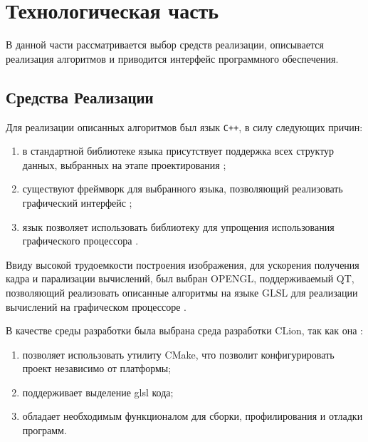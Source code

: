 \chapter{Технологическая часть}
В данной части рассматривается выбор средств реализации, описывается реализация алгоритмов и приводится интерфейс программного
обеспечения.




\section{Средства Реализации}
Для реализации описанных алгоритмов был язык \texttt{C++}, в силу следующих причин:
\begin{enumerate}
	\item в стандартной библиотеке языка присутствует поддержка всех структур данных,
	выбранных на этапе проектирования \cite{STL};
	\item существуют фреймворк для выбранного языка, позволяющий реализовать графический интерфейс \cite{qt_c++};
	\item язык позволяет использовать библиотеку для упрощения использования графического процессора \cite{qt_opengl}.
\end{enumerate}


Ввиду высокой трудоемкости построения изображения, для ускорения получения кадра и
парализации вычислений, был выбран OPENGL, поддерживаемый QT, позволяющий реализовать описанные алгоритмы на языке GLSL для реализации вычислений на графическом процессоре \cite{ray_trace_glsl}.

В качестве среды разработки была выбрана среда разработки  CLion, так как она \cite{clion}:
\begin{enumerate}
    \item позволяет использовать утилиту CMake, что позволит конфигурировать проект независимо от платформы;
    \item поддерживает выделение glsl кода;
    \item обладает необходимым функционалом для сборки, профилирования и отладки программ.
\end{enumerate}


